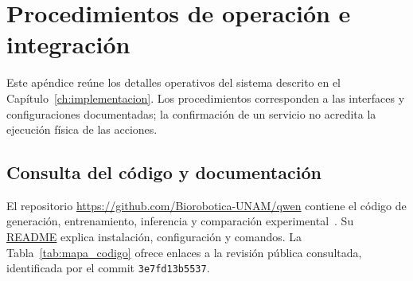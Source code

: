 \chapter{Procedimientos de operación e integración}
\label{app:operacion}

Este apéndice reúne los detalles operativos del sistema descrito en el Capítulo~\ref{ch:implementacion}. Los procedimientos corresponden a las interfaces y configuraciones documentadas; la confirmación de un servicio no acredita la ejecución física de las acciones.

\section{Consulta del código y documentación}
\label{app:codigo}

El repositorio \url{https://github.com/Biorobotica-UNAM/qwen} contiene el código de generación, entrenamiento, inferencia y comparación experimental~\cite{repositorio_qwen_tesis}. Su \href{https://github.com/Biorobotica-UNAM/qwen/blob/3e7fd13b55375d9e776d7a1352673ecf06e45b2a/README.md}{README} explica instalación, configuración y comandos. La Tabla~\ref{tab:mapa_codigo} ofrece enlaces a la revisión pública consultada, identificada por el commit \texttt{3e7fd13b5537}.


